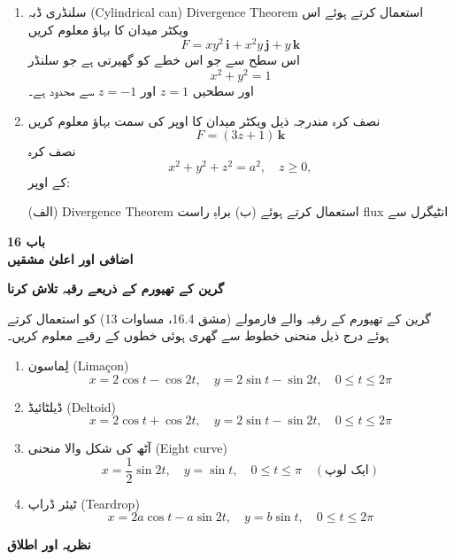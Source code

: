 \begin{enumerate}
\begin{enumerate}
\item سلنڈری ڈبہ (Cylindrical can)  
Divergence Theorem استعمال کرتے ہوئے اس ویکٹر میدان کا بہاؤ معلوم کریں
\[
F = xy^2\,\mathbf{i} + x^2y\,\mathbf{j} + y\,\mathbf{k}
\]
اس سطح سے جو اس خطے کو گھیرتی ہے جو سلنڈر
\[
x^2 + y^2 = 1
\]
اور سطحیں \(z = 1\) اور \(z = -1\) سے محدود ہے۔

\item نصف کرہ  
مندرجہ ذیل ویکٹر میدان کا اوپر کی سمت بہاؤ معلوم کریں
\[
F = (3z + 1)\,\mathbf{k}
\]
نصف کرہ
\[
x^2 + y^2 + z^2 = a^2,\quad z \ge 0,
\]
کے اوپر:

(الف) Divergence Theorem استعمال کرتے ہوئے  
(ب) براہِ راست flux انٹیگرل سے

\end{enumerate}






\begin{center}
\textbf{باب 16\\ اضافی اور اعلیٰ مشقیں}
\end{center}

\vspace{0.5cm}

\textbf{گرین کے تھیورم کے ذریعے رقبہ تلاش کرنا}

گرین کے تھیورم کے رقبہ والے فارمولے (مشق 16.4، مساوات 13) کو استعمال کرتے ہوئے درج ذیل منحنی خطوط سے گھری ہوئی خطوں کے رقبے معلوم کریں۔

\begin{enumerate}
\item لِماسون (Limaçon)  
\[
x = 2\cos t - \cos 2t,\quad y = 2\sin t - \sin 2t,\quad 0 \le t \le 2\pi
\]

\item ڈیلٹائیڈ (Deltoid)  
\[
x = 2\cos t + \cos 2t,\quad y = 2\sin t - \sin 2t,\quad 0 \le t \le 2\pi
\]

\item آٹھ کی شکل والا منحنی (Eight curve)  
\[
x = \frac{1}{2}\sin 2t,\quad y = \sin t,\quad 0 \le t \le \pi \quad (\text{ایک لوپ})
\]

\item ٹیئر ڈراپ (Teardrop)  
\[
x = 2a\cos t - a\sin 2t,\quad y = b\sin t,\quad 0 \le t \le 2\pi
\]
\end{enumerate}

\textbf{نظریہ اور اطلاق}

\begin{enumerate}
\setcounter{enumi}{4}


\end{enumerate}
\end{enumerate}

